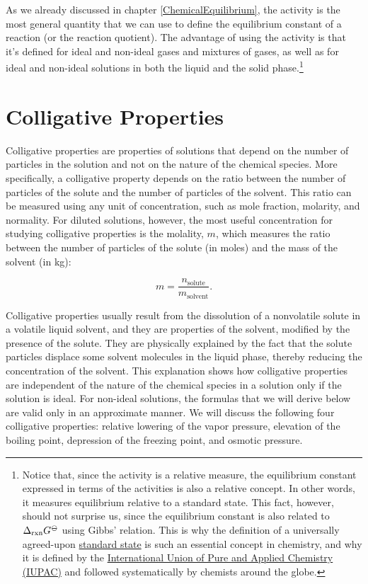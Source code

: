 \documentclass[
  9pt,
]{extbook}
\theoremstyle{definition}
\theoremstyle{definition}
\theoremstyle{definition}
\theoremstyle{remark}
\begin{document}
As we already discussed in chapter \ref{ChemicalEquilibrium}, the activity is the most general quantity that we can use to define the equilibrium constant of a reaction (or the reaction quotient). The advantage of using the activity is that it's defined for ideal and non-ideal gases and mixtures of gases, as well as for ideal and non-ideal solutions in both the liquid and the solid phase.\footnote{Notice that, since the activity is a relative measure, the equilibrium constant expressed in terms of the activities is also a relative concept. In other words, it measures equilibrium relative to a standard state. This fact, however, should not surprise us, since the equilibrium constant is also related to \(\Delta_{\text{rxn}} G^{{-\kern-6pt{\ominus}\kern-6pt-}}\) using Gibbs' relation. This is why the definition of a universally agreed-upon \href{https://en.wikipedia.org/wiki/Standard_state}{standard state} is such an essential concept in chemistry, and why it is defined by the \href{https://en.wikipedia.org/wiki/International_Union_of_Pure_and_Applied_Chemistry}{International Union of Pure and Applied Chemistry (IUPAC)} and followed systematically by chemists around the globe.}

\hypertarget{colligative-properties}{%
\section{Colligative Properties}\label{colligative-properties}}

Colligative properties are properties of solutions that depend on the number of particles in the solution and not on the nature of the chemical species. More specifically, a colligative property depends on the ratio between the number of particles of the solute and the number of particles of the solvent. This ratio can be measured using any unit of concentration, such as mole fraction, molarity, and normality. For diluted solutions, however, the most useful concentration for studying colligative properties is the molality, \(m\), which measures the ratio between the number of particles of the solute (in moles) and the mass of the solvent (in kg):

\begin{equation}
m = \frac{n_{\text{solute}}}{m_{\text{solvent}}}.
\label{eq:coll1}
\end{equation}

Colligative properties usually result from the dissolution of a nonvolatile solute in a volatile liquid solvent, and they are properties of the solvent, modified by the presence of the solute. They are physically explained by the fact that the solute particles displace some solvent molecules in the liquid phase, thereby reducing the concentration of the solvent. This explanation shows how colligative properties are independent of the nature of the chemical species in a solution only if the solution is ideal. For non-ideal solutions, the formulas that we will derive below are valid only in an approximate manner. We will discuss the following four colligative properties: relative lowering of the vapor pressure, elevation of the boiling point, depression of the freezing point, and osmotic pressure.
\end{document}
